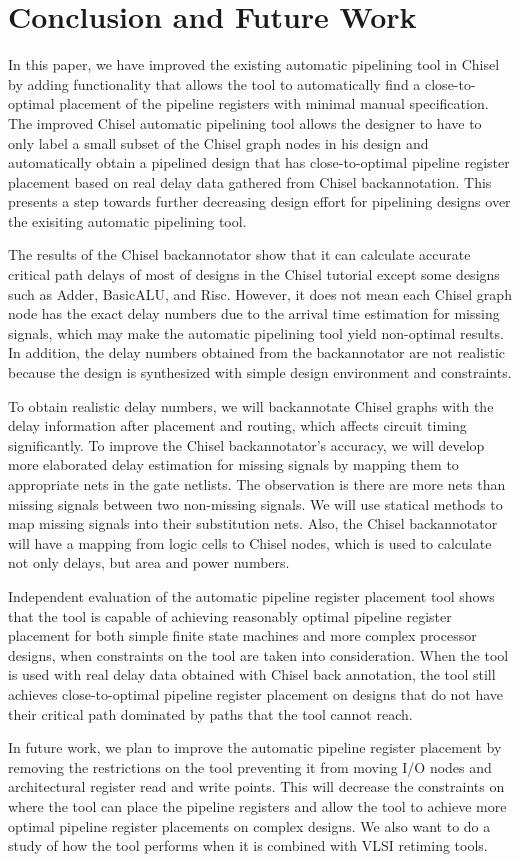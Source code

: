 \section{Conclusion and Future Work}
In this paper, we have improved the existing automatic pipelining tool in Chisel by adding functionality that allows the tool to automatically find a close-to-optimal placement of the pipeline registers with minimal manual specification. The improved Chisel automatic pipelining tool allows the designer to have to only label a small subset of the Chisel graph nodes in his design and automatically obtain a pipelined design that has close-to-optimal pipeline register placement based on real delay data gathered from Chisel backannotation. This presents a step towards further decreasing design effort for pipelining designs over the exisiting automatic pipelining tool.

The results of the Chisel backannotator show that it can calculate accurate critical path delays of most of designs in the Chisel tutorial except some designs such as Adder, BasicALU, and Risc. However, it does not mean each Chisel graph node has the exact delay numbers due to the arrival time estimation for missing signals, which may make the automatic pipelining tool yield non-optimal results. In addition, the delay numbers obtained from the backannotator are not realistic because the design is synthesized with simple design environment and constraints.  

To obtain realistic delay numbers, we will backannotate Chisel graphs with the delay information after placement and routing, which affects circuit timing significantly. To improve the Chisel backannotator's accuracy, we will develop more elaborated delay estimation for missing signals by mapping them to appropriate nets in the gate netlists. The observation is there are more nets than missing signals between two non-missing signals. We will use statical methods to map missing signals into their substitution nets. Also, the Chisel backannotator will have a mapping from logic cells to Chisel nodes, which is used to calculate not only delays, but area and power numbers.

Independent evaluation of the automatic pipeline register placement tool shows that the tool is capable of achieving reasonably optimal pipeline register placement for both simple finite state machines and more complex processor designs, when constraints on the tool are taken into consideration. When the tool is used with real delay data obtained with Chisel back annotation, the tool still achieves close-to-optimal pipeline register placement on designs that do not have their critical path dominated by paths that the tool cannot reach.

In future work, we plan to improve the automatic pipeline register placement by removing the restrictions on the tool preventing it from moving I/O nodes and architectural register read and write points. This will decrease the constraints on where the tool can place the pipeline registers and allow the tool to achieve more optimal pipeline register placements on complex designs. We also want to do a study of how the tool performs when it is combined with VLSI retiming tools.
